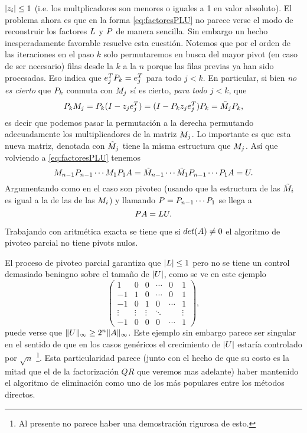 \begin{tcolorbox}
$|\zb_i|\le 1$ (i.e. los multplicadores son menores o iguales a 1 en valor absoluto).
El problema ahora es que en la forma \eqref{eq:factoresPLU}  no parece verse el modo de reconstruir los factores $\Lb$ y $\Pb$ de manera sencilla. Sin embargo un hecho inesperadamente favorable resuelve esta cuestión. Notemos que por el orden de las iteraciones en el paso $k$ solo permutaremos en busca del mayor pivot (en caso de ser necesario) filas desde la $k$ a la $n$ porque las filas previas ya han sido procesadas. Eso indica que
$\eb_j^T\Pb_k=\eb^T_j$ para todo $j<k$. En particular, si bien \emph{no es cierto} que $\Pb_k$
conmuta con $\Mb_j$ sí es cierto,
\emph{para todo $j<k$}, que
$$
\Pb_k\Mb_j=\Pb_k
(\Ib-\zb_{j}\eb_{j}^T)=
(\Ib-\Pb_k\zb_{j}\eb_{j}^T)\Pb_k=
\tilde\Mb_j \Pb_k,
$$
es decir que podemos pasar la permutación a la derecha permutando adecuadamente los multiplicadores de la matriz $\Mb_j$. Lo importante es que esta nueva matriz, denotada con $\tilde \Mb_j$ tiene la misma estructura que $\Mb_j$. Así que volviendo a  \eqref{eq:factoresPLU} tenemos
$$
\Mb_{n-1}\Pb_{n-1}\cdots \Mb_{1}\Pb_{1}\Ab= \tilde \Mb_{n-1}\cdots \tilde \Mb_{1} \Pb_{n-1}\cdots \Pb_{1}\Ab=\Ub.
$$
Argumentando como en el caso son pivoteo (usando que la estructura de las $\tilde \Mb_i$ es igual a la de las de las $\Mb_i$) y llamando
$\Pb=\Pb_{n-1}\cdots \Pb_{1}$ se llega a
$$
\Pb\Ab=\Lb\Ub.
$$

\begin{tcolorbox}
[colback=black!15!white,colframe=black!75!black] \begin{proposicion}
  Trabajando con aritmética exacta se tiene que si $det(\Ab)\neq 0$ el algoritmo de pivoteo parcial no tiene pivots nulos.
 \end{proposicion}
\end{tcolorbox}

\begin{tcolorbox}
[colback=black!15!white,colframe=black!75!black] \begin{observacion}
\label{obs:malgauss}
El proceso de pivoteo parcial garantiza que $|\Lb|\le 1$ pero no
se  tiene un control demasiado beningno sobre el tamaño de
$|\Ub|$, como se ve en este ejemplo
$$
\begin{pmatrix}
 1&0&0&\cdots&0&1\\
 -1&1&0&\cdots&0&1\\
 -1&0&1&0&\cdots&1 \\
 \vdots &\vdots&\vdots& \ddots&&\vdots\\
 -1&0&0&0&\cdots&1
\end{pmatrix},
$$
puede verse que $\|\Ub\|_\infty \ge 2^n\|\Ab\|_\infty$.
Este ejemplo sin embargo parece ser singular en el sentido de que en los casos genéricos el crecimiento de $|\Ub|$ estaría controlado por $\sqrt{n}$ \cite{TB} \footnote{Al presente no parece haber una demostración rigurosa de esto.}. Esta particularidad parece (junto con el hecho de que su costo es la mitad que el de la factorización $QR$ que veremos mas adelante) haber mantenido el algoritmo de eliminación como uno de los más populares entre los métodos directos.
 \end{observacion}
\end{tcolorbox}


\end{tcolorbox}
